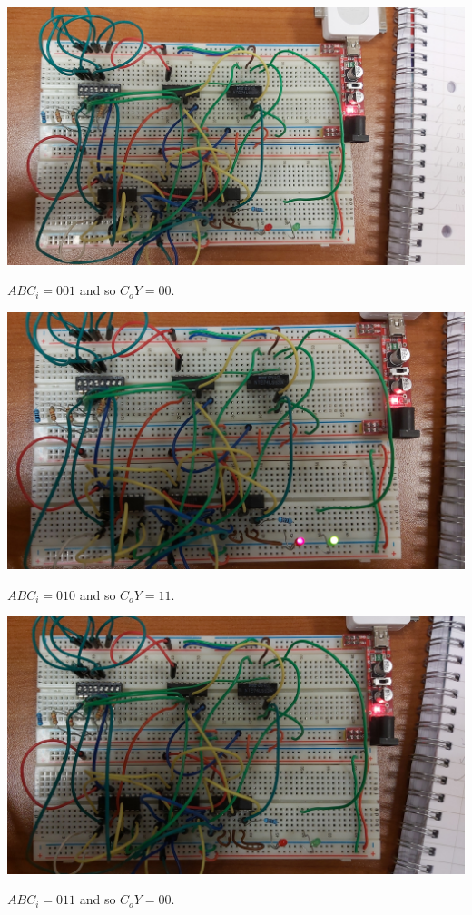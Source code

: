 \documentclass{article}
\begin{document}
\includegraphics[width=\textwidth]{./figures/00110.jpg}
\begin{center}
	$ABC_i = 001$ and so $C_o Y= 00$.\\
\end{center}


\includegraphics[width=\textwidth]{./figures/01010.jpg}
\begin{center}
	$ABC_i = 010$ and so $C_o Y= 11$.
\end{center}

\vspace{2em}

\includegraphics[width=\textwidth]{./figures/01110.jpg}
\begin{center}
	$ABC_i = 011$ and so $C_o Y= 00$.
\end{center}
\end{document}

